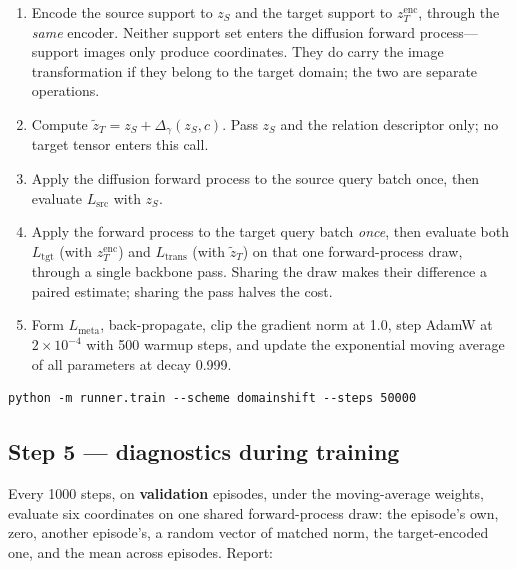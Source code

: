 \documentclass[11pt]{article}
\newcommand{\zS}{z_{S}}
\newcommand{\zencT}{z^{\mathrm{enc}}_{T}}
\newcommand{\ztilT}{\tilde{z}_{T}}
\begin{document}
\begin{enumerate}[leftmargin=*, itemsep=3pt]
\item Encode the source support to $\zS$ and the target support to $\zencT$, through the
      \emph{same} encoder. Neither support set enters the diffusion forward process---support
      images only produce coordinates. They do carry the image transformation if they belong to the
      target domain; the two are separate operations.
\item Compute $\ztilT = \zS + \Delta_\gamma(\zS, c)$. Pass $\zS$ and the relation descriptor only;
      no target tensor enters this call.
\item Apply the diffusion forward process to the source query batch once, then evaluate
      $L_{\mathrm{src}}$ with $\zS$.
\item Apply the forward process to the target query batch \emph{once}, then evaluate both
      $L_{\mathrm{tgt}}$ (with $\zencT$) and $L_{\mathrm{trans}}$ (with $\ztilT$) on that one
      forward-process draw, through a single backbone pass. Sharing the draw makes their difference
      a paired estimate; sharing the pass halves the cost.
\item Form $L_{\mathrm{meta}}$, back-propagate, clip the gradient norm at 1.0, step AdamW at
      $2\times10^{-4}$ with 500 warmup steps, and update the exponential moving average of all
      parameters at decay 0.999.
\end{enumerate}

\begin{verbatim}
python -m runner.train --scheme domainshift --steps 50000
\end{verbatim}

\subsection*{Step 5 --- diagnostics during training}

Every 1000 steps, on \textbf{validation} episodes, under the moving-average weights, evaluate six
coordinates on one shared forward-process draw: the episode's own, zero, another episode's, a random
vector of matched norm, the target-encoded one, and the mean across episodes. Report:
\end{document}
